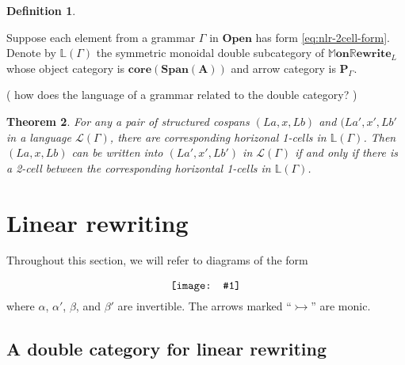 \documentclass{amsart}
\newcommand{\LL}{\mathbb{L}}
\newcommand{\A}{\cat{A}}
\newcommand{\NonLinArrCat}{\cat{P}}
\newcommand{\core}{\mathbf{core}}
\newcommand{\cat}[1]{\mathbf{#1}}
\newcommand{\diagram}[1]{\raisebox{-0.5\height}{\texttt{[image: \#1]}}}
\newcommand{\Span}{\mathbf{Span}}
\newcommand{\OpenOb}{\mathbf{Open} }
\newcommand{\MMonRewrite}{ \mathbb{M}\mathbf{on}\mathbb{R}\mathbf{ewrite} }
\newcommand{\edit}[1]{\textcolor{editcolour}{(#1)}}
\newtheorem{theorem}{Theorem}[section]
\theoremstyle{remark}
\theoremstyle{definition}
\newtheorem{definition}[theorem]{Definition}
\begin{document}
\begin{definition} \label{df:gramr-gen-dbl-cat}
	
  Suppose each element from a grammar $ \Gamma $ in $ \OpenOb $ has
  form \eqref{eq:nlr-2cell-form}.  Denote by $ \LL ( \Gamma ) $ the
  symmetric monoidal double subcategory of $ \MMonRewrite_{L} $ whose
  object category is \( \core ( \Span ( \A ) ) \) and arrow category
  is \( \NonLinArrCat_\Gamma \).
        
\end{definition}

\edit{ how does the language of a grammar related to the double category? } 


\begin{theorem}
  
  For any a pair of structured cospans \( (La,x,Lb) \) and
  \( (La',x',Lb' \) in a language \( \mathcal{L} (\Gamma) \), there
  are corresponding horizonal 1-cells in \( \LL (\Gamma) \). Then
  \( (La,x,Lb) \) can be written into \( (La',x',Lb') \) in
  \( \mathcal{L} (\Gamma) \) if and only if there is a 2-cell between
  the corresponding horizontal 1-cells in \( \LL (\Gamma) \).
  
\end{theorem}


\section{Linear rewriting} \label{sec:linear-rewriting}




Throughout this section, we will refer to diagrams of the form
\begin{equation}
  \label{eq:ln-2cell-form}
  \diagram{diag_lr_dbl-mon-rewrite-2cell}
\end{equation}
where $ \alpha $, $ \alpha' $, $ \beta $, and $ \beta' $ are invertible. The
arrows marked ``$ \rightarrowtail $'' are monic.


\subsection{A double category for linear rewriting}
\label{sec:dble-cat-linr-rewr}
\end{document}
